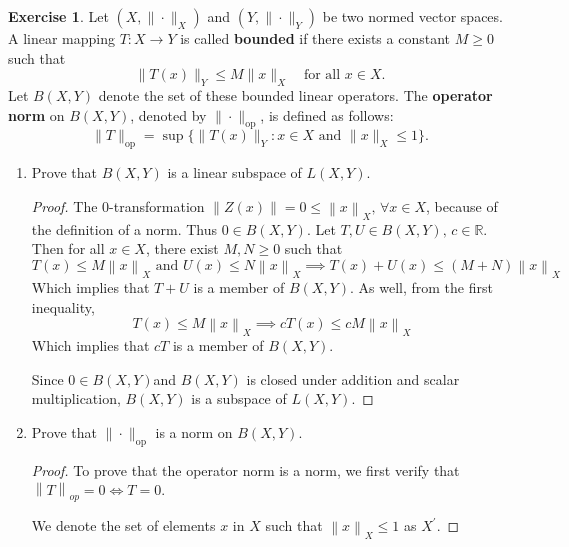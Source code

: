 \documentclass{article}
\theoremstyle{plain} %
\numberwithin{thm}{section} %
\theoremstyle{definition}
\newtheorem{exercise}[thm]{Exercise} %
\begin{document}
    \pagebreak
    \begin{exercise}
        Let $(X,\|\cdot\|_X)$ and $(Y,\|\cdot\|_Y)$ be two normed vector spaces. A linear mapping $T:X\rightarrow Y$ is called \textbf{bounded} if there exists a constant $M\geq 0$ such that
        \[ \|T(x)\|_Y \leq M \|x\|_X \quad \text{for all $x\in X$.}  \]
        Let $B(X,Y)$ denote the set of these bounded linear operators. The \textbf{operator norm} on $B(X,Y)$, denoted by $\|\cdot\|_{\mathrm{op}}$, is defined as follows:
            \[ \|T\|_{\mathrm{op}} = \sup\{ \|T(x)\|_Y : x\in X \text{ and } \|x\|_X\leq 1 \}. \]
        \begin{enumerate}[label=(\alph*)]
            \item Prove that $B(X,Y)$ is a linear subspace of $L(X,Y)$.
            
            \begin{proof}
                The 0-transformation \(\left\lVert Z(x) \right\rVert  = 0 \leq \left\lVert x \right\rVert _X \text{, } \forall x \in X\), because of the definition of a norm. Thus \(0 \in B(X,Y)\).
                Let \(T, U \in B(X,Y) \text{, } c \in \mathbb{R}\). Then for all \(x \in X\), there exist \(M, N \geq 0\) such that
                \[
                    T(x) \leq M \left\lVert x \right\rVert _X \text{ and } U(x) \leq N \left\lVert x \right\rVert _X \implies T(x) + U(x) \leq (M+N) \left\lVert x \right\rVert _X
                \] 
                Which implies that \(T+U\) is a member of \(B(X,Y)\). As well, from the first inequality,
                \[
                    T(x) \leq M \left\lVert x \right\rVert _X \implies cT(x) \leq  cM \left\lVert x \right\rVert _X
                \]
                Which implies that \(cT\) is a member of \(B(X,Y)\).

                Since \(0 \in B(X,Y)\)and \(B(X,Y)\) is closed under addition and scalar multiplication, \(B(X,Y)\) is a subspace of \(L(X,Y)\).

            \end{proof}
            \item Prove that $\|\cdot\|_{\mathrm{op}}$ is a norm on $B(X,Y)$.
        
            \begin{proof}
                To prove that the operator norm is a norm, we first verify that \(\left\lVert T \right\rVert _{op} = 0 \iff T = 0\).

                We denote the set of elements \(x\) in \(X\) such that \(\left\lVert x \right\rVert _X \leq 1\) as \(X^\prime\).


\end{proof}
\end{enumerate}
\end{exercise}
\end{document}
